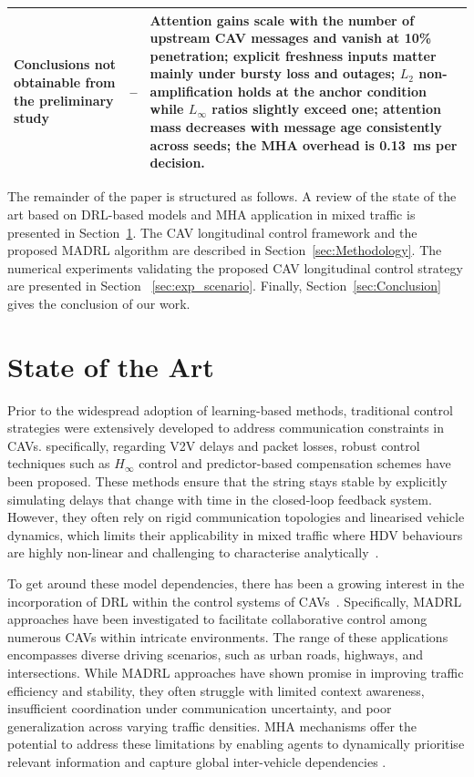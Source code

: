 \documentclass{ieeeaccess}
\begin{document}
\begin{table}[htbp]
\begin{tabularx}{\textwidth}{|p{3.1cm}|X|X|}
\rowcolor{yellow}Conclusions not obtainable from the preliminary study & -- & Attention gains scale with the number of upstream CAV messages and vanish at 10\% penetration; explicit freshness inputs matter mainly under bursty loss and outages; $L_2$ non-amplification holds at the anchor condition while $L_\infty$ ratios slightly exceed one; attention mass decreases with message age consistently across seeds; the MHA overhead is 0.13~ms per decision. \\ \hline %
\end{tabularx}
\end{table}



The remainder of the paper is structured as follows. A review of the state of the art based on DRL-based models and MHA application in mixed traffic is presented in Section~\ref{sec:STA}. The CAV longitudinal control framework and the proposed MADRL algorithm are described in Section~\ref{sec:Methodology}. The numerical experiments validating the proposed CAV longitudinal control strategy are presented in Section ~\ref{sec:exp_scenario}. Finally, Section~\ref{sec:Conclusion} gives the conclusion of our work.

\section{State of the Art}
\label{sec:STA}

Prior to the widespread adoption of learning-based methods, traditional control strategies were extensively developed to address communication constraints in CAVs. specifically, regarding V2V delays and packet losses, robust control techniques such as $H_\infty$ control \cite{YANG2025103212} and predictor-based compensation schemes \cite{WEI201796} have been proposed. These methods ensure that the string stays stable by explicitly simulating delays that change with time in the closed-loop feedback system. However, they often rely on rigid communication topologies and linearised vehicle dynamics, which limits their applicability in mixed traffic where HDV behaviours are highly non-linear and challenging to characterise analytically~\cite{findeisen2002introduction, Li2019}.

To get around these model dependencies, there has been a growing interest in the incorporation of DRL within the control systems of CAVs~\cite{Kiran2022_Survey, 11152633}.  Specifically, MADRL approaches have been investigated to facilitate collaborative control among numerous CAVs within intricate environments. The range of these applications encompasses diverse driving scenarios, such as urban roads, highways, and intersections.  While MADRL approaches have shown promise in improving traffic efficiency and stability, they often struggle with limited context awareness, insufficient coordination under communication uncertainty, and poor generalization across varying traffic densities. MHA mechanisms offer the potential to address these limitations by enabling agents to dynamically prioritise relevant information and capture global inter-vehicle dependencies \cite{wang2024hypergraph}.
\end{document}
